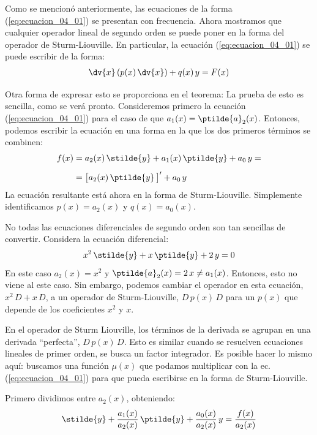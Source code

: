 \par
Como se mencionó anteriormente, las ecuaciones de la forma (\ref{eq:ecuacion_04_01}) se presentan con frecuencia. Ahora mostramos que cualquier operador lineal de segundo orden se puede poner en la forma del operador de Sturm-Liouville. En particular, la ecuación (\ref{eq:ecuacion_04_01}) se puede escribir de la forma:
\begin{align}
\dv{x} \left( p(x) \, \dv{x} \right) + q(x) \, y =  F(x)
\label{eq:ecuacion_04_05}
\end{align}

Otra forma de expresar esto se proporciona en el teorema: La prueba de esto es sencilla, como se verá pronto. Consideremos primero la ecuación (\ref{eq:ecuacion_04_01}) para el caso de que $a_{1} (x) = \ptilde{a}_{2} (x)$. Entonces, podemos escribir la ecuación en una forma en la que los dos primeros términos se combinen:
\begin{align}
\begin{aligned}
f(x) &= a_{2} (x) \, \stilde{y} + a_{1} (x) \, \ptilde{y} + a_{0} \, y = \\[0.5em]
&= \big[ a_{2} (x) \, \ptilde{y} \, \big]^{\prime} + a_{0} \, y
\end{aligned}
\label{eq:ecuacion_04_06}
\end{align}
La ecuación resultante está ahora en la forma de Sturm-Liouville. Simplemente identificamos $p(x) = a_{2} (x)$ y $q (x) = a_{0} (x)$.
\par
No todas las ecuaciones diferenciales de segundo orden son tan sencillas de convertir. Considera la ecuación diferencial:
\begin{align*}
x^{2} \, \stilde{y} + x \, \ptilde{y} + 2 \, y = 0
\end{align*}
En este caso $a_{2} (x) = x^{2}$ y $\ptilde{a}_{2} (x) = 2 \, x \neq a_{1} (x)$. Entonces, esto no viene al este caso. Sin embargo, podemos cambiar el operador en esta ecuación, $x^{2} \, D + x \, D$, a un operador de Sturm-Liouville, $D \, p (x) \, D$ para un $p (x)$ que depende de los coeficientes $x^{2}$ y $x$.
\par
En el operador de Sturm Liouville, los términos de la derivada se agrupan en una derivada \enquote{perfecta}, $D \, p (x) \, D$. Esto es similar cuando se resuelven ecuaciones lineales de primer orden, se busca un factor integrador. Es posible hacer lo mismo aquí: buscamos una función $\mu (x)$ que podamos multiplicar con la ec. (\ref{eq:ecuacion_04_01}) para que pueda escribirse en la forma de Sturm-Liouville.
\par
Primero dividimos entre $a_{2} (x)$, obteniendo:
\begin{align*}
\stilde{y} + \dfrac{a_{1}(x)}{a_{2}(x)} \, \ptilde{y} + \dfrac{a_{0}(x)}{a_{2}(x)} \, y = \dfrac{f(x)}{a_{2}(x)}
\end{align*}

